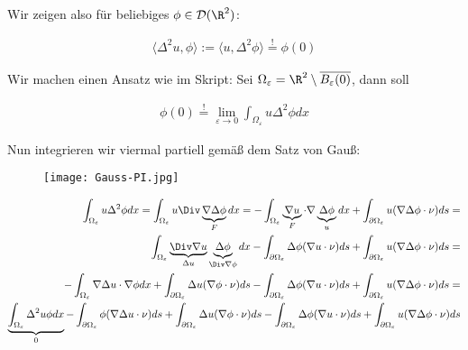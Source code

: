 \begin{solution}

Wir zeigen also für beliebiges $\phi \in \mathcal{D}(\R^2)$:

\begin{align*}
  \langle \Delta^2u, \phi \rangle
  :=
  \langle u, \Delta^2 \phi \rangle
  \stackrel{!}{=}
  \phi(0)
\end{align*}

Wir machen einen Ansatz wie im Skript: Sei $\Omega_\varepsilon = \R^2 \setminus \overline{B_\varepsilon(0)}$, dann soll

\begin{align*}
  \phi(0)
  \stackrel{!}{=}
  \lim_{\varepsilon \rightarrow 0}\int_{\Omega_\varepsilon} u \Delta^2 \phi dx
\end{align*}

Nun integrieren wir viermal partiell gemäß dem Satz von Gauß:

\begin{figure}[h!]
  \centering
  \texttt{[image: Gauss-PI.jpg]}
\end{figure}

\begin{align*}
  \int_{\Omega_\varepsilon} u \Delta^2 \phi dx
  =
  \int_{\Omega_\varepsilon} u \Div\underbrace{\nabla \Delta \phi}_F dx
  =
  -\int_{\Omega_\varepsilon} \underbrace{\nabla u}_{F} \cdot \nabla \underbrace{\Delta \phi}_{u} dx
  +
  \int_{\partial \Omega_\varepsilon} u(\nabla \Delta \phi \cdot \nu) ds
  = \\
  \int_{\Omega_\varepsilon} \underbrace{\Div\nabla u}_{\Delta u} \underbrace{\Delta \phi}_{\Div \nabla \phi} dx
  -
  \int_{\partial \Omega_\varepsilon} \Delta \phi (\nabla u \cdot \nu) ds
  +
  \int_{\partial \Omega_\varepsilon} u(\nabla \Delta \phi \cdot \nu) ds
  = \\
  -\int_{\Omega_\varepsilon} \nabla \Delta u \cdot \nabla \phi dx
  +
  \int_{\partial \Omega_\varepsilon} \Delta u (\nabla \phi \cdot \nu) ds
  -
  \int_{\partial \Omega_\varepsilon} \Delta \phi (\nabla u \cdot \nu) ds
  +
  \int_{\partial \Omega_\varepsilon} u(\nabla \Delta \phi \cdot \nu) ds
  = \\
  \underbrace{\int_{\Omega_\varepsilon} \Delta^2 u \phi dx}_{0}
  -
  \int_{\partial \Omega_\varepsilon} \phi (\nabla \Delta u \cdot \nu) ds
  +
  \int_{\partial \Omega_\varepsilon} \Delta u (\nabla \phi \cdot \nu) ds
  -
  \int_{\partial \Omega_\varepsilon} \Delta \phi (\nabla u \cdot \nu) ds
  +
  \int_{\partial \Omega_\varepsilon} u(\nabla \Delta \phi \cdot \nu) ds
\end{align*}


\end{solution}
